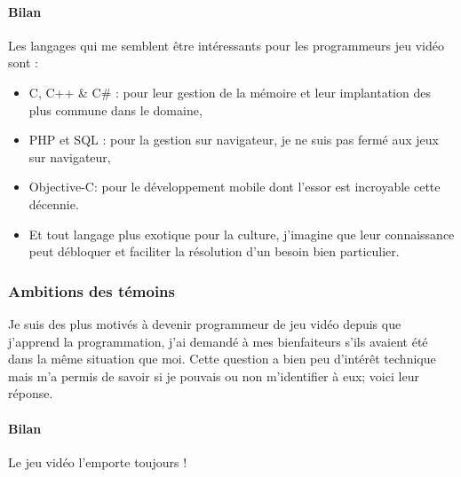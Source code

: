 \documentclass[12pt, a4paper]{report} %
\begin{document}
\paragraph{Bilan}
Les langages qui me semblent être intéressants pour les programmeurs jeu vidéo sont :
\begin{itemize}
\item
  C, C++ \& C\# : pour leur gestion de la mémoire et leur implantation des plus commune dans le domaine,
\item
  PHP et SQL : pour la gestion sur navigateur, je ne suis pas fermé aux jeux sur navigateur,
\item
  Objective-C: pour le développement mobile dont l'essor est incroyable cette décennie. 
\item
  Et tout langage plus exotique pour la culture, j'imagine que leur connaissance peut débloquer et faciliter la résolution d'un besoin bien particulier.
\end{itemize}

\subsubsection{Ambitions des témoins}
Je suis des plus motivés à devenir programmeur de jeu vidéo depuis que j'apprend la programmation, j'ai demandé à mes bienfaiteurs s'ils avaient été dans la même situation que moi. Cette question a bien peu d'intérêt technique mais m'a permis de savoir si je pouvais ou non m'identifier à eux; voici leur réponse.
\paragraph{Bilan} Le jeu vidéo l'emporte toujours ! 
\end{document}
